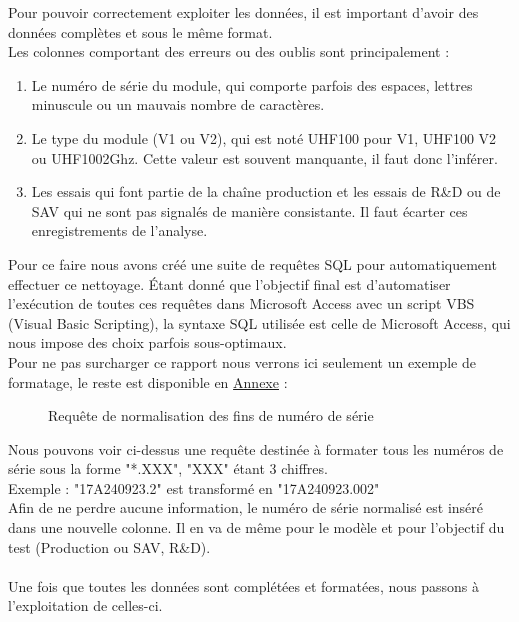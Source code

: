 \documentclass[a4paper, 11pt]{article}
\begin{document}
  Pour pouvoir correctement exploiter les données, il est important d'avoir des données complètes et sous le même format.\\
  Les colonnes comportant des erreurs ou des oublis sont principalement :\\
  \begin{enumerate}
    \item[$\bullet$] Le numéro de série du module, qui comporte parfois des espaces, lettres minuscule ou un mauvais nombre de caractères.
    \item[$\bullet$] Le type du module (V1 ou V2), qui est noté UHF100 pour V1, UHF100 V2 ou UHF1002Ghz. Cette valeur est souvent manquante, il faut donc l'inférer.
    \item[$\bullet$] Les essais qui font partie de la chaîne production et les essais de R\&D ou de SAV qui ne sont pas signalés de manière consistante. Il faut écarter ces enregistrements de l'analyse.
  \end{enumerate}
\par\bigskip
  Pour ce faire nous avons créé une suite de requêtes SQL pour automatiquement effectuer ce nettoyage. Étant donné que l'objectif final est d'automatiser l'exécution de toutes ces requêtes dans Microsoft Access avec un script VBS (Visual Basic Scripting), la syntaxe SQL utilisée est celle de Microsoft Access, qui nous impose des choix parfois sous-optimaux.\\
  Pour ne pas surcharger ce rapport nous verrons ici seulement un exemple de formatage, le reste est disponible en \hyperref[fig:setup-access]{Annexe} :
  \par\bigskip
  \begin{figure}[H]
    
    \label{fig:setup-access-08}
    \caption{Requête de normalisation des fins de numéro de série}
  \end{figure}
\par\bigskip

Nous pouvons voir ci-dessus une requête destinée à formater tous les numéros de série sous la forme "*.XXX", "XXX" étant 3 chiffres.\\
Exemple : "17A240923.2" est transformé en "17A240923.002"\\
Afin de ne perdre aucune information, le numéro de série normalisé est inséré dans une nouvelle colonne. Il en va de même pour le modèle et pour l'objectif du test (Production ou SAV, R\&D).\\
\\
Une fois que toutes les données sont complétées et formatées, nous passons à l'exploitation de celles-ci.
\par\bigskip
\end{document}
